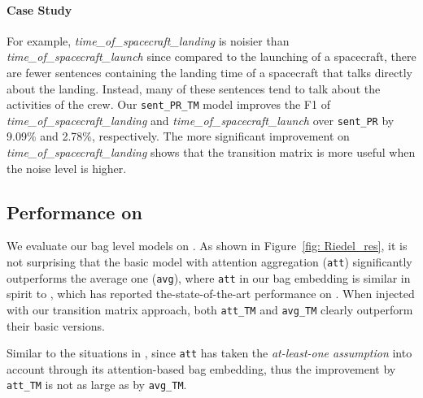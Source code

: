 \paragraph{Case Study}
 For example, \textit{time\_of\_spacecraft\_landing} is noisier than \textit{time\_of\_spacecraft\_launch} since compared to the launching of a spacecraft, there are fewer sentences containing the landing time of a spacecraft that talks directly about the landing. Instead, many of these sentences tend to talk about the activities of the crew. Our \texttt{sent\_PR\_TM} model improves the F1 of \textit{time\_of\_spacecraft\_landing} and \textit{time\_of\_spacecraft\_launch} over \texttt{sent\_PR} by 9.09\% and 2.78\%, respectively. The more significant improvement on \textit{time\_of\_spacecraft\_landing} shows that the transition matrix is more useful when the noise level is higher.


\subsection{Performance on \EntityRE}
We evaluate our bag level models on \EntityRE.
As shown in Figure~\ref{fig: Riedel_res}, it is not surprising that the basic model with attention aggregation (\texttt{att}) significantly outperforms the average one (\texttt{avg}), where \texttt{att}  in our bag embedding is similar in spirit to \cite{lin2016neural},
which has reported the-state-of-the-art performance on \EntityRE.
When injected with our transition matrix approach,  both \texttt{att\_TM} and \texttt{avg\_TM} clearly outperform their basic versions.

Similar to the situations in \TimeRE, since  \texttt{att} has taken the \textit{at-least-one assumption} into account  through its attention-based bag embedding, thus the improvement by \texttt{att\_TM}  is not as large as by \texttt{avg\_TM}.

